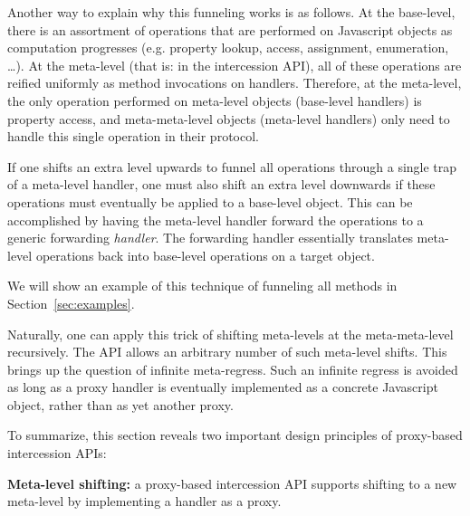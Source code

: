 \documentclass{acm_proc_article-sp}
\begin{document}

Another way to explain why this funneling works is as follows. At the base-level, there is an assortment of operations that are performed on Javascript objects as computation progresses (e.g. property lookup, access, assignment, enumeration, \ldots). At the meta-level (that is: in the intercession API), all of these operations are reified uniformly as method invocations on handlers. Therefore, at the meta-level, the only operation performed on meta-level objects (base-level handlers) is property access, and meta-meta-level objects (meta-level handlers) only need to handle this single operation in their protocol.

If one shifts an extra level upwards to funnel all operations through a single trap of a meta-level handler, one must also shift an extra level downwards if these operations must eventually be applied to a base-level object. This can be accomplished by having the meta-level handler forward the operations to a generic forwarding \emph{handler}. The forwarding handler essentially translates meta-level operations back into base-level operations on a target object.

We will show an example of this technique of funneling all methods in Section~\ref{sec:examples}.

Naturally, one can apply this trick of shifting meta-levels at the meta-meta-level recursively. The API allows an arbitrary number of such meta-level shifts. This brings up the question of infinite meta-regress. Such an infinite regress is avoided as long as a proxy handler is eventually implemented as a concrete Javascript object, rather than as yet another proxy.

To summarize, this section reveals two important design principles of proxy-based intercession APIs:

\textbf{Meta-level shifting:} a proxy-based intercession API supports shifting to a new meta-level by implementing a handler as a proxy.
\end{document}
